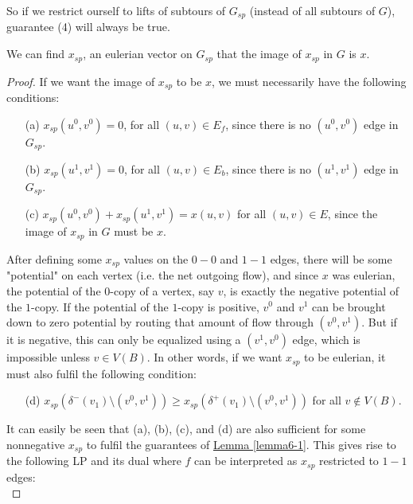 \documentclass[./main.tex]{subfiles}
\begin{document}
			So if we restrict ourself to lifts of subtours of $G_{sp}$ (instead of all subtours of $G$), guarantee (4) will always be true.\vspace{2mm}
			\begin{lemma}\label{lemma6-1}		
				We can find $x_{sp}$, an eulerian vector on $G_{sp}$ that the image of $x_{sp}$ in $G$ is $x$.
			\end{lemma}
			\begin{proof}
			If we want the image of $x_{sp}$ to be $x$, we must necessarily have the following conditions:
			\begin{itemize}
				\item[(a)] $x_{sp}(u^0,v^0) = 0$, for all $(u,v)\in E_f$, since there is no $(u^0,v^0)$ edge in $G_{sp}$.
				\item[(b)] $x_{sp}(u^1,v^1) = 0$, for all $(u,v)\in E_b$, since there is no $(u^1,v^1)$ edge in $G_{sp}$.
				\item[(c)] $x_{sp}(u^0,v^0)+x_{sp}(u^1,v^1) = x(u,v)$ for all $(u,v)\in E$, since the image of $x_{sp}$ in $G$ must be $x$.
			\end{itemize}
	\vspace{2mm}
	After defining some $x_{sp}$ values on the $0-0$ and $1-1$ edges, there will be some "potential" on each vertex (i.e. the net outgoing flow), and since $x$ was eulerian, the potential of the $0$-copy of a vertex, say $v$, is exactly the negative potential of the $1$-copy.
			If the potential of the $1$-copy is positive, $v^0$ and $v^1$ can be brought down to zero potential by routing that amount of flow through $(v^0,v^1)$. 
			But if it is negative, this can only be equalized using a $(v^1,v^0)$ edge, which is impossible unless $v\in V(B)$. In other words, if we want $x_{sp}$ to be eulerian, it must also fulfil the following condition:
			\begin{itemize}
				\item[(d)] $x_{sp}(\delta^-(v_1)\setminus (v^0,v^1) )\geqslant x_{sp}(\delta^+(v_1)\setminus (v^0,v^1))$ for all $v\notin V(B)$.
			\end{itemize}

			It can easily be seen that (a), (b), (c), and (d) are also sufficient for some nonnegative $x_{sp}$ to fulfil the guarantees of \hyperref[lemma6-1]{Lemma \ref{lemma6-1}}.
			 This gives rise to the following LP and its dual where $f$ can be interpreted as $x_{sp}$ restricted to $1-1$ edges:\\\vspace{2mm}
			

\end{proof}
\end{document}
